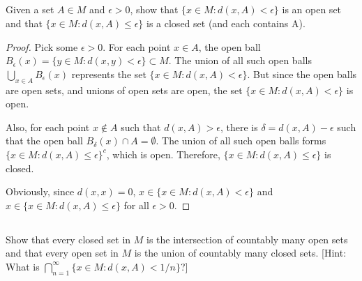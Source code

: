 \subsection{} Given a set $A \in M$ and $\epsilon > 0$, show that $\{x \in M : d(x , A) < \epsilon\}$ is an open set and that $\{x \in M: d(x ,   A) \leq \epsilon\}$ is a   closed set (and each contains A). 


\begin{proof}
Pick some $\epsilon > 0$. For each point $x \in A$, the open ball $B_\epsilon(x) = \{y \in M : d(x , y) < \epsilon\} \subset M$. The union of all such open balls $\bigcup_{x \in A} B_\epsilon(x)$ represents the set $\{x \in M : d(x , A) < \epsilon\}$. But since the open balls are open sets, and unions of open sets are open, the set $\{x \in M : d(x , A) < \epsilon\}$ is open.

Also, for each point $x \notin A$ such that $d(x, A) > \epsilon$, there is $\delta = d(x,A) - \epsilon$ such that the open ball $B_\delta(x) \cap A = \emptyset$. The union of all such open balls forms $\{x \in M: d(x ,   A) \leq \epsilon\}^c$, which is open. Therefore, $\{x \in M: d(x ,   A) \leq \epsilon\}$ is closed.

Obviously, since $d(x,x) = 0$, $x \in \{x \in M : d(x , A) < \epsilon\}$ and $x \in \{x \in M: d(x ,   A) \leq \epsilon\}$ for all $\epsilon > 0$.
\end{proof}

\subsection{} Show that every closed set in $M$ is the intersection of countably many open sets and that every open set in $M$ is the union of countably many closed sets. [Hint: What is $\bigcap_{n=1}^\infty \{x \in M: d(x,A) < 1/n\}$?]

